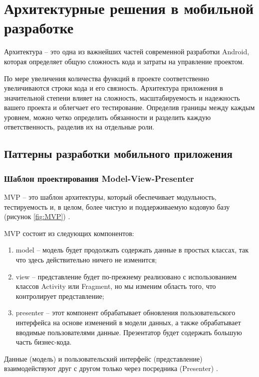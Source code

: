 \chapter{Архитектурные решения в мобильной разработке}

Архитектура -- это одна из важнейших частей современной разработки Android, которая определяет общую сложность кода и затраты на управление проектом.

По мере увеличения количества функций в проекте соответственно увеличиваются строки кода и его связность. Архитектура приложения в значительной степени влияет на сложность, масштабируемость и надежность вашего проекта и облегчает его тестирование. Определив границы между каждым уровнем, можно четко определить обязанности и разделить каждую ответственность, разделив их на отдельные роли.



\section{Паттерны разработки мобильного приложения}



\subsection{Шаблон проектирования Model-View-Presenter}

MVP  -- это шаблон архитектуры, который обеспечивает модульность, тестируемость и, в целом, более чистую и поддерживаемую кодовую базу (рисунок \ref{fig:MVP}) \cite{book:25}.

MVP состоит из следующих компонентов:

\begin{enumerate}
    \item model -- модель будет продолжать содержать данные в простых классах, так что здесь действительно ничего не изменится;
    \item view -- представление будет по-прежнему реализовано с использованием классов Activity или Fragment, но мы изменим область того, что контролирует представление;
    \item presenter -- этот компонент обрабатывает обновления пользовательского интерфейса на основе изменений в модели данных, а также обрабатывает вводимые пользователями данные. Презентатор будет содержать большую часть бизнес-кода.
\end{enumerate}

Данные (модель) и пользовательский интерфейс (представление) взаимодействуют друг с другом только через посредника (Presenter) \cite{book:prof}.

